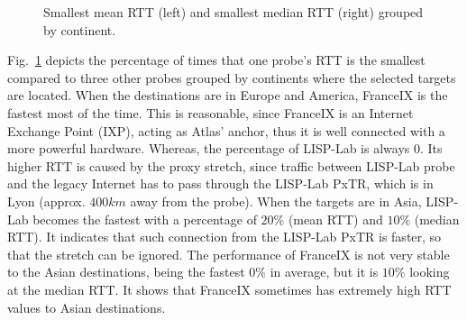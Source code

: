 \begin{figure}[!t]
\begin{minipage}[c]{.49\linewidth}
\begin{center}
		\end{center}
	\end{minipage}
	\caption{Smallest mean RTT (left) and smallest median RTT (right) grouped by continent.}
	\label{4_probes_to_alexa_top50_proportion_bar_geo}
\end{figure}
	
Fig.~\ref{4_probes_to_alexa_top50_proportion_bar_geo} depicts the percentage of times that one probe's RTT is the smallest compared to three other probes grouped by continents where the selected targets are located. When the destinations are in Europe and America, FranceIX is the fastest most of the time. This is reasonable, since FranceIX is an Internet Exchange Point (IXP), acting as Atlas' anchor, thus it is well connected with a more powerful hardware. Whereas, the percentage of LISP-Lab is always 0. Its higher RTT is caused by the proxy stretch, since traffic between LISP-Lab probe and the legacy Internet has to pass through the LISP-Lab PxTR, which is in Lyon (approx. $400km$ away from the probe). When the targets are in Asia, LISP-Lab becomes the fastest with a percentage of $20\%$ (mean RTT) and $10\%$ (median RTT). It indicates that such connection from the LISP-Lab PxTR is faster, so that the stretch can be ignored. The performance of FranceIX is not very stable to the Asian destinations, being the fastest $0\%$ in average, but it is $10\%$ looking at
the median RTT. It shows that FranceIX sometimes has extremely high RTT values to Asian destinations. 
	

